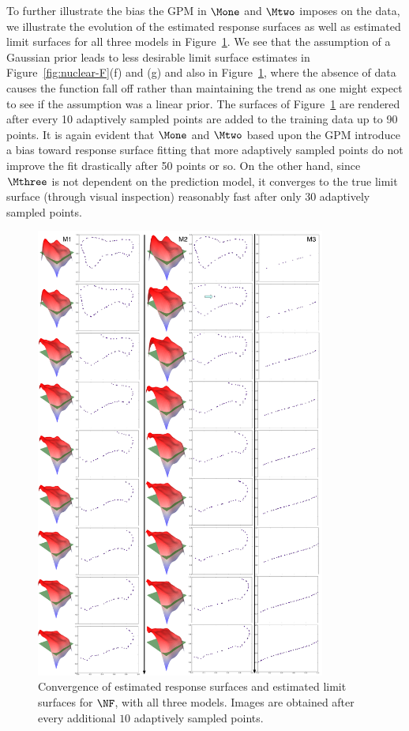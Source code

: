 To further illustrate the bias the GPM in $\Mone$ and $\Mtwo$ imposes on the data, we illustrate the evolution of the estimated response surfaces as well as estimated limit surfaces for all three models in Figure~\ref{fig:nuclear-F-surface-converge}.
%
We see that the assumption of a Gaussian prior leads to less desirable limit surface estimates in Figure~\ref{fig:nuclear-F}(f) and (g) and also in Figure~\ref{fig:nuclear-F-surface-converge}, where the absence of data causes the function fall off rather than maintaining the trend as one might expect to see if the assumption was a linear prior.
%
The surfaces of Figure~\ref{fig:nuclear-F-surface-converge} are rendered after every 10 adaptively sampled points are added to the training data up to 90 points.
%
It is again evident that $\Mone$ and $\Mtwo$ based upon the GPM introduce a bias toward response surface fitting that more adaptively sampled points do not improve the fit drastically after 50 points or so.
%
On the other hand, since $\Mthree$ is not dependent on the prediction model, it converges to the true limit surface (through visual inspection) reasonably fast after only 30 adaptively sampled points.

\begin{figure}%
  \centering
  \includegraphics[width=0.85\textwidth]{figs/chap5/nuclear-F-surface-converge.pdf}
  \caption{Convergence of estimated response surfaces and estimated limit surfaces for $\protect\NF$,  with all three models. Images are obtained after every additional $10$ adaptively sampled points.}
  \label{fig:nuclear-F-surface-converge}
\end{figure}

